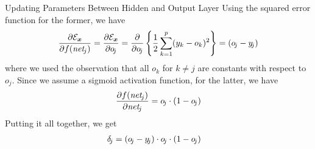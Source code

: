 \begin{frame}{Updating Parameters Between Hidden and Output Layer}
Using the squared error function %
for the former, we have
\begin{align*}
   \frac{\partial {\mathcal E}_{\boldsymbol x}}{\partial f(\mathit{net}_{\!j})}  =
   \frac{\partial {\mathcal E}_{\boldsymbol x}}{\partial o_{\!j}}
   = \frac{\partial}{\partial o_{\!j}} \left\{\frac{1}{2} \sum^{p}_{k=1}
   (y_{k} - o_{k})^2\right\} \notag
   = \left( o_{\!j} - y_{\!j} \right)
\end{align*}
where we used the observation that all $o_k$ for $k \ne j$ are constants
with respect to $o_{\!j}$.
Since we assume a sigmoid activation function, for the latter, we have
\begin{align*}
   \frac{\partial f(\mathit{net}_{\!j})}{\partial \mathit{net}_{\!j}}  
   = o_{\!j} \cdot \left(1 - o_{\!j}\right)
\end{align*}
Putting it all together, we get
\begin{align*}
    \delta_{\!j} & =\left( o_{\!j} - y_{\!j} \right) \cdot o_{\!j} \cdot \left(1 -
   o_{\!j}\right)
\end{align*}
\end{frame}
%
